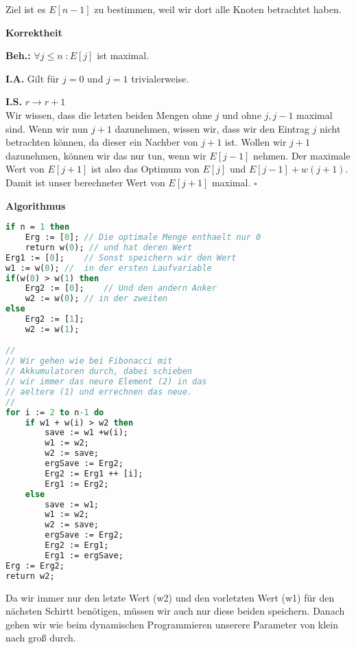 \documentclass[11pt,a4paper,ngerman]{article}
\begin{document}
\begin{enumerate}[\bfseries (a)]
\begin{description}
Ziel ist es $E[n-1]$ zu bestimmen, weil wir dort alle Knoten betrachtet haben.

\item{\bfseries Korrektheit} 

\begin{description}

\item{\bfseries Beh.:} $\forall j \leq n \; : E[j]$ ist maximal.

\item{\bfseries I.A.} Gilt für $j = 0$ und $j=1$ trivialerweise.

\item{\bfseries I.S.} $r \longrightarrow r+1$ \\
Wir wissen, dass die letzten beiden Mengen ohne $j$ und ohne $j , j-1$ maximal sind. Wenn wir nun $j+1$ dazunehmen, wissen wir, dass wir den Eintrag $j$ nicht betrachten können, da dieser ein Nachber von $j+1$ ist. Wollen wir $j+1$ dazunehmen, können wir das nur tun, wenn wir $E[j-1]$ nehmen. Der maximale Wert von $E[j+1]$ ist also das Optimum von $E[j]$ und $E[j-1] + w(j+1)$.\\

Damit ist unser berechneter Wert von $E[j+1]$ maximal. \mbox{} \hfill $\square$

\end{description}

\pagebreak

\item{\bfseries Algorithmus}

\begin{lstlisting}[language=Pascal]
if n = 1 then
	Erg := [0];	// Die optimale Menge enthaelt nur 0
	return w(0); // und hat deren Wert
Erg1 := [0];	// Sonst speichern wir den Wert
w1 := w(0);	//  in der ersten Laufvariable
if(w(0) > w(1) then
	Erg2 := [0];	// Und den andern Anker
	w2 := w(0);	// in der zweiten
else
	Erg2 := [1];
	w2 := w(1);

//
// Wir gehen wie bei Fibonacci mit
// Akkumulatoren durch, dabei schieben
// wir immer das neure Element (2) in das
// aeltere (1) und errechnen das neue.
//
for i := 2 to n-1 do
	if w1 + w(i) > w2 then
		save := w1 +w(i);
		w1 := w2;
		w2 := save;
		ergSave := Erg2;
		Erg2 := Erg1 ++ [i];
		Erg1 := Erg2;
	else
		save := w1;
		w1 := w2;
		w2 := save;
		ergSave := Erg2;
		Erg2 := Erg1;
		Erg1 := ergSave;
Erg := Erg2;
return w2;
\end{lstlisting}

Da wir immer nur den letzte Wert (w2) und den vorletzten Wert (w1) für den nächsten Schirtt benötigen, müssen wir auch nur diese beiden speichern. Danach gehen wir wie beim dynamischen Programmieren unserere Parameter von klein nach groß durch.


\end{description}
\end{enumerate}
\end{document}
